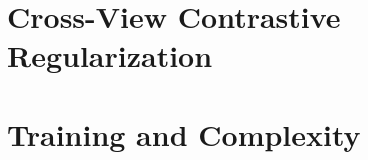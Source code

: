 \section{Cross-View Contrastive Regularization}
\label{sec:cl}


\section{Training and Complexity}
\label{sec:method-train}

